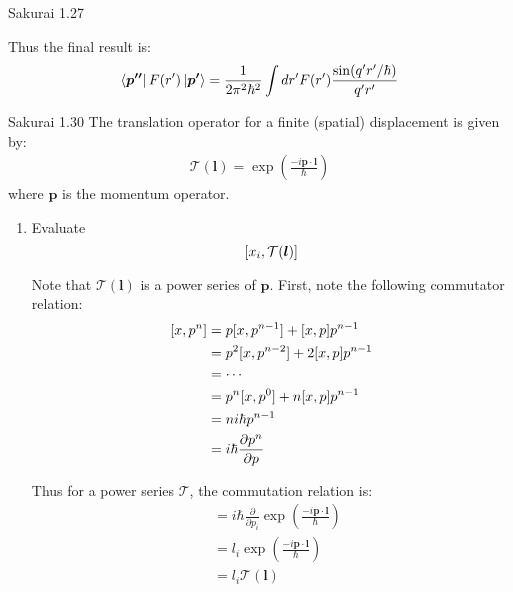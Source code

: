 \documentclass{article}
\begin{document}
\begin{section}{Sakurai 1.27}
\begin{enumerate}
\begin{tcolorbox}
		Thus the final result is:
		\begin{align*}
			\bra{\boldsymbol{p''}}{F(r')}\ket{\boldsymbol{p'}}
			= \frac{1}{2 \pi^2 \hbar^2} \int dr' F(r') \frac{\sin(q'r'/\hbar)}{q' r'}
		\end{align*}
	\end{tcolorbox}
\end{enumerate}
\end{section}

\newpage
\begin{section}{Sakurai 1.30}
\newcommand{\bp}{\boldsymbol{p}}
\newcommand{\bl}{\boldsymbol{l}}
\newcommand{\bx}{\boldsymbol{x}}
\newcommand{\cT}{\mathcal{T}}
The translation operator for a finite (spatial) displacement is given by:
\begin{align*}
	\cT(\boldsymbol{l}) = \exp\left(\frac{-i \bp \cdot \bl}{\hbar}\right)
\end{align*}
where $\bp$ is the momentum operator.

\begin{enumerate}
	\item Evaluate
	$$
		\sbracket{x_i, \cT(\bl)}
	$$

	\begin{tcolorbox}[breakable]
		Note that $\cT(\bl)$ is a power series of $\bp$. First, note the following commutator relation:
		\begin{align*}
			\left[x, p^n\right] & = p[x, p^{n-1}] + [x,p] p^{n-1}           \\
			                  & = p^2 [x, p^{n-2}] + 2[x,p] p^{n-1}       \\
			                  & = \cdots                                  \\
			                  & = p^n [x, p^{0}] + n[x,p] p^{n-1}         \\
			                  & = ni \hbar p^{n-1}                        \\
			                  & = i \hbar \frac{\partial p^n}{\partial p}
		\end{align*}

		Thus for a power series $\cT$, the commutation relation is:
		\begin{align*}
			[x_i, \cT(\bl)] & = i \hbar \frac{\partial}{\partial p_i} \exp \left( \frac{-i \bp \cdot \bl}{\hbar} \right) \\
			                & = l_i \exp \left( \frac{-i \bp \cdot \bl}{\hbar} \right)                                   \\
			                & = l_i \cT(\bl)
		\end{align*}
	\end{tcolorbox}


\end{enumerate}
\end{section}
\end{document}
